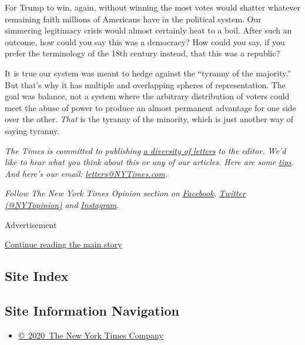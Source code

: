 For Trump to win, again, without winning the most votes would shatter
whatever remaining faith millions of Americans have in the political
system. Our simmering legitimacy crisis would almost certainly heat to a
boil. After such an outcome, how could you say this was a democracy? How
could you say, if you prefer the terminology of the 18th century
instead, that this was a republic?

It is true our system was meant to hedge against the ``tyranny of the
majority.'' But that's why it has multiple and overlapping spheres of
representation. The goal was balance, not a system where the arbitrary
distribution of voters could meet the abuse of power to produce an
almost permanent advantage for one side over the other. \emph{That} is
the tyranny of the minority, which is just another way of saying
tyranny.

\emph{The Times is committed to publishing}
\href{https://www.nytimes3xbfgragh.onion/2019/01/31/opinion/letters/letters-to-editor-new-york-times-women.html}{\emph{a
diversity of letters}} \emph{to the editor. We'd like to hear what you
think about this or any of our articles. Here are some}
\href{https://help.nytimes3xbfgragh.onion/hc/en-us/articles/115014925288-How-to-submit-a-letter-to-the-editor}{\emph{tips}}\emph{.
And here's our email:}
\href{mailto:letters@NYTimes.com}{\emph{letters@NYTimes.com}}\emph{.}

\emph{Follow The New York Times Opinion section on}
\href{https://www.facebookcorewwwi.onion/nytopinion}{\emph{Facebook}}\emph{,}
\href{http://twitter.com/NYTOpinion}{\emph{Twitter (@NYTopinion)}}
\emph{and}
\href{https://www.instagram.com/nytopinion/}{\emph{Instagram}}\emph{.}

Advertisement

\protect\hyperlink{after-bottom}{Continue reading the main story}

\hypertarget{site-index}{%
\subsection{Site Index}\label{site-index}}

\hypertarget{site-information-navigation}{%
\subsection{Site Information
Navigation}\label{site-information-navigation}}

\begin{itemize}
\tightlist
\item
  \href{https://help.nytimes3xbfgragh.onion/hc/en-us/articles/115014792127-Copyright-notice}{©~2020~The
  New York Times Company}
\end{itemize}

